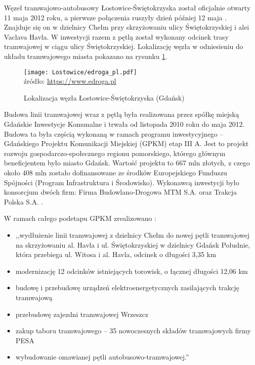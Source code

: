 \documentclass[twoside,12pt]{article}
\begin{document}
	Węzeł tramwajowo-autobusowy Łostowice-Świętokrzyska został oficjalnie otwarty 11 maja 2012 roku, a pierwsze połączenia ruszyły dzień później 12 maja \cite{gazeta_gdansk}. Znajduje się on w dzielnicy Chełm przy skrzyżowaniu ulicy Świętokrzyskiej i alei Vaclava Havla. W inwestycji razem z pętlą został wykonany odcinek trasy tramwajowej w ciągu ulicy Świętokrzyskiej. Lokalizację węzła w odniesieniu do układu tramwajowego miasta pokazano na rysunku \ref{lostowice1}.
	
	\begin{figure}[H]
		\centering
		\caption{Lokalizacja węzła Łostowice-Świętokrzyska (Gdańsk)}
		\texttt{[image: Lostowice/edroga\_pl.pdf]}\\
		\footnotesize{źródło: \url{https://www.edroga.pl}}
		\label{lostowice1}
	\end{figure}
	
	Budowa linii tramwajowej wraz z pętlą była realizowana przez spółkę miejską Gdańskie Inwestycje Komunalne i trwała od listopada 2010 roku do maja 2012. Budowa ta była częścią wykonaną w ramach programu inwestycyjnego -- Gdańskiego Projektu Komunikacji Miejskiej (GPKM) etap III A. Jest to projekt rozwoju gospodarczo-społecznego regionu pomorskiego, którego głównym beneficjentem było miasto Gdańsk. Wartość projektu to 667 mln złotych, z czego około 408 mln zostało dofinansowane ze środków Europejskiego Funduszu Spójności (Program Infrastruktura i Środowisko). Wykonawcą inwestycji było konsorcjum dwóch firm: Firma Budowlano-Drogowa MTM S.A. oraz Trakcja Polska S.A. \cite{portal_gdansk}. 
	
	\begin{samepage}
	W ramach całego podetapu GPKM zrealizowano \cite{portal_gdansk}:
	\begin{itemize}\setlength{\itemsep}{0em}
	\item ,,wydłużenie linii tramwajowej z dzielnicy Chełm do nowej pętli tramwajowej na skrzyżowaniu al. Havla i ul. Świętokrzyskiej w dzielnicy Gdańsk Południe, która przebiega ul. Witosa i al. Havla, odcinek o długości 3,35 km
	\item modernizację 12 odcinków istniejących torowisk, o łącznej długości 12,06 km
	\item budowę i przebudowę urządzeń elektroenergetycznych zasilających trakcję tramwajową
	\item przebudowę zajezdni tramwajowej Wrzeszcz
	\item zakup taboru tramwajowego – 35 nowoczesnych składów tramwajowych firmy PESA
	\item wybudowanie omawianej pętli autobusowo-tramwajowej.'' \cite{portal_gdansk}
	\end{itemize}\end{samepage}
	
\end{document}
